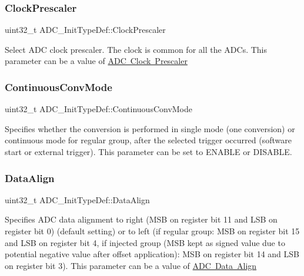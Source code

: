 \subsubsection{\texorpdfstring{ClockPrescaler}{ClockPrescaler}}
{\footnotesize\ttfamily uint32\+\_\+t A\+D\+C\+\_\+\+Init\+Type\+Def\+::\+Clock\+Prescaler}

Select A\+DC clock prescaler. The clock is common for all the A\+D\+Cs. This parameter can be a value of \mbox{\hyperlink{group___a_d_c___clock_prescaler}{A\+DC Clock Prescaler}} \mbox{\label{struct_a_d_c___init_type_def_a4bf957b8be6ae85d71e9376e6f1e633b}} 
\subsubsection{\texorpdfstring{ContinuousConvMode}{ContinuousConvMode}}
{\footnotesize\ttfamily uint32\+\_\+t A\+D\+C\+\_\+\+Init\+Type\+Def\+::\+Continuous\+Conv\+Mode}

Specifies whether the conversion is performed in single mode (one conversion) or continuous mode for regular group, after the selected trigger occurred (software start or external trigger). This parameter can be set to E\+N\+A\+B\+LE or D\+I\+S\+A\+B\+LE. \mbox{\label{struct_a_d_c___init_type_def_af9ec9040d55aa68c23d92d174b464ac1}} 
\subsubsection{\texorpdfstring{DataAlign}{DataAlign}}
{\footnotesize\ttfamily uint32\+\_\+t A\+D\+C\+\_\+\+Init\+Type\+Def\+::\+Data\+Align}

Specifies A\+DC data alignment to right (M\+SB on register bit 11 and L\+SB on register bit 0) (default setting) or to left (if regular group\+: M\+SB on register bit 15 and L\+SB on register bit 4, if injected group (M\+SB kept as signed value due to potential negative value after offset application)\+: M\+SB on register bit 14 and L\+SB on register bit 3). This parameter can be a value of \mbox{\hyperlink{group___a_d_c___data___align}{A\+DC Data Align}} \mbox{\label{struct_a_d_c___init_type_def_afb62fa7128d7c97d53d2eb170ad467eb}} 

